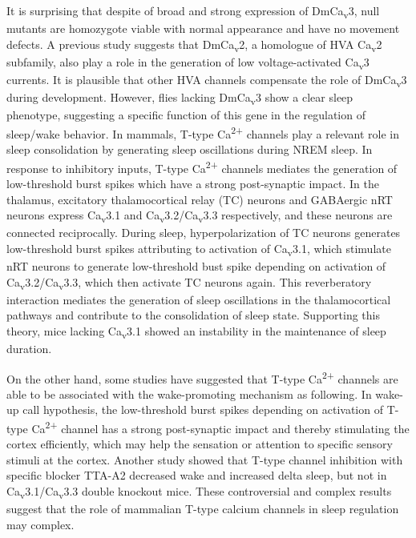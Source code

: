 It is surprising that despite of broad and strong expression of DmCa\textsubscript{v}3, null mutants are homozygote viable with normal appearance and have no movement defects.
A previous study suggests that DmCa\textsubscript{v}2, a homologue of HVA Ca\textsubscript{v}2 subfamily, also play a role in the generation of low voltage-activated Ca\textsubscript{v}3 currents\cite{Ryglewski:2012jk}.
It is plausible that other HVA channels compensate the role of DmCa\textsubscript{v}3 during development.
However, flies lacking DmCa\textsubscript{v}3 show a clear sleep phenotype, suggesting a specific function of this gene in the regulation of sleep/wake behavior.
In mammals, T-type Ca\textsuperscript{2+} channels play a relevant role in sleep consolidation by generating sleep oscillations during NREM sleep.
In response to inhibitory inputs, T-type Ca\textsuperscript{2+} channels mediates the generation of low-threshold burst spikes which have a strong post-synaptic impact.
In the thalamus, excitatory thalamocortical relay (TC) neurons and GABAergic nRT neurons express Ca\textsubscript{v}3.1 and Ca\textsubscript{v}3.2/Ca\textsubscript{v}3.3 respectively, and these neurons are connected reciprocally.
During sleep, hyperpolarization of TC neurons generates low-threshold burst spikes attributing to activation of Ca\textsubscript{v}3.1, which stimulate nRT neurons to generate low-threshold bust spike depending on activation of Ca\textsubscript{v}3.2/Ca\textsubscript{v}3.3, which then activate TC neurons again.
This reverberatory interaction mediates the generation of sleep oscillations in the thalamocortical pathways and contribute to the consolidation of sleep state.
Supporting this theory, mice lacking Ca\textsubscript{v}3.1 showed an instability in the maintenance of sleep duration\cite{Lee:2004ey}.

On the other hand, some studies have suggested that T-type Ca\textsuperscript{2+} channels are able to be associated with the wake-promoting mechanism as following.
In wake-up call hypothesis, the low-threshold burst spikes depending on activation of T-type Ca\textsuperscript{2+} channel has a strong post-synaptic impact and thereby stimulating the cortex efficiently\cite{swadlow:2001aa}, which may help the sensation or attention to specific sensory stimuli at the cortex.
Another study showed that T-type channel inhibition with specific blocker TTA-A2 decreased wake and increased delta sleep, but not in Ca\textsubscript{v}3.1/Ca\textsubscript{v}3.3 double knockout mice\cite{kraus:2010aa}.
These controversial and complex results suggest that the role of mammalian T-type calcium channels in sleep regulation may complex. 

